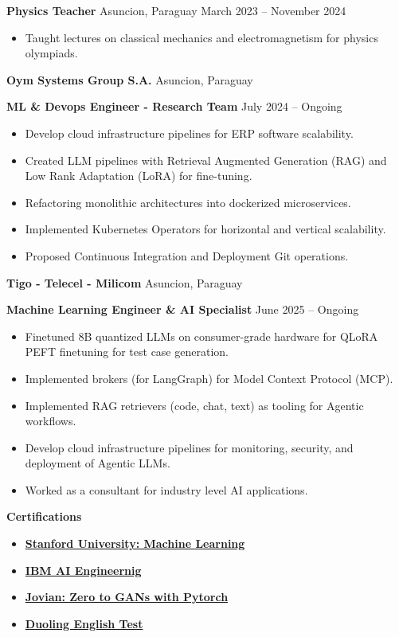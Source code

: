 \documentclass[11pt]{article}
\begin{document}
\textbf{Physics Teacher}	\hfill Asuncion, Paraguay
\hfill March 2023 – November 2024
\begin{itemize}[noitemsep]
  \item Taught lectures on classical mechanics and electromagnetism for physics olympiads.
\end{itemize}

\textbf{Oym Systems Group S.A.}	\hfill Asuncion, Paraguay

\textbf{ML \& Devops Engineer - Research Team} \hfill July 2024 – Ongoing
\begin{itemize}[noitemsep]
  \item Develop cloud infrastructure pipelines for ERP software scalability.
  \item Created LLM pipelines with Retrieval Augmented Generation (RAG) and Low Rank Adaptation (LoRA) for fine-tuning.
  \item Refactoring monolithic architectures into dockerized microservices.
  \item Implemented Kubernetes Operators for horizontal and vertical scalability.
  \item Proposed Continuous Integration and Deployment Git operations.
\end{itemize}

\textbf{Tigo - Telecel - Milicom}	\hfill Asuncion, Paraguay

\textbf{Machine Learning Engineer \& AI Specialist} \hfill June 2025 – Ongoing
\begin{itemize}[noitemsep]
  \item Finetuned 8B quantized LLMs on consumer-grade hardware for QLoRA PEFT finetuning for test case generation.
  \item Implemented brokers (for LangGraph) for Model Context Protocol (MCP).
  \item Implemented RAG retrievers (code, chat, text) as tooling for Agentic workflows.
  \item Develop cloud infrastructure pipelines for monitoring, security, and deployment of Agentic LLMs.
  \item Worked as a consultant for industry level AI applications.
\end{itemize}

\begin{center}
    \textbf{Certifications}
\end{center}

\begin{itemize}
    \item \href{https://www.coursera.org/account/accomplishments/specialization/certificate/VNCPL4MXPB5A}{\textbf{Stanford University: Machine Learning}}
    \item \href{https://www.coursera.org/account/accomplishments/specialization/certificate/JEYSUHXTCYU5}{\textbf{IBM AI Engineernig}}
    \item \href{https://jovian.com/certificate/MFQTQMZXGM}{\textbf{Jovian: Zero to GANs with Pytorch}}
    \item \href{https://certs.duolingo.com/vc54x03gh7zcprnd}{\textbf{Duoling English Test}}
\end{itemize}
\end{document}
